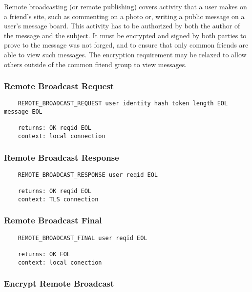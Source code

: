 \documentclass[letterpaper,11pt,oneside]{article}
\begin{document}
Remote broadcasting (or remote publishing) covers activity that a user makes on
a friend's site, such as commenting on a photo or, writing a public message on
a user's message board. This activity has to be authorized by both the author
of the message and the subject. It must be encrypted and signed by both parties
to prove to the message was not forged, and to ensure that only common friends
are able to view such messages. The encryption requirement may be relaxed to
allow others outside of the common friend group to view messages.

\subsubsection{Remote Broadcast Request}

\vspace{10pt}
\begin{verbatim}
    REMOTE_BROADCAST_REQUEST user identity hash token length EOL message EOL

    returns: OK reqid EOL
    context: local connection
\end{verbatim}
\vspace{10pt}

\subsubsection{Remote Broadcast Response}

\vspace{10pt}
\begin{verbatim}
    REMOTE_BROADCAST_RESPONSE user reqid EOL 

    returns: OK reqid EOL
    context: TLS connection
\end{verbatim}
\vspace{10pt}

\subsubsection{Remote Broadcast Final}

\vspace{10pt}
\begin{verbatim}
    REMOTE_BROADCAST_FINAL user reqid EOL 

    returns: OK EOL
    context: local conection
\end{verbatim}
\vspace{10pt}

\subsubsection{Encrypt Remote Broadcast}
\end{document}
